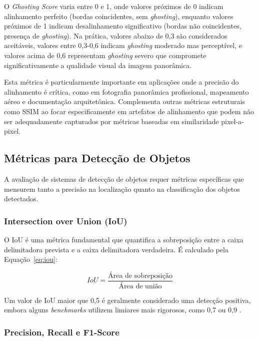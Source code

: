 O \textit{Ghosting Score} varia entre 0 e 1, onde valores próximos de 0 indicam alinhamento perfeito (bordas coincidentes, sem \textit{ghosting}), enquanto valores próximos de 1 indicam desalinhamento significativo (bordas não coincidentes, presença de \textit{ghosting}). Na prática, valores abaixo de 0,3 são considerados aceitáveis, valores entre 0,3-0,6 indicam \textit{ghosting} moderado mas perceptível, e valores acima de 0,6 representam \textit{ghosting} severo que compromete significativamente a qualidade visual da imagem panorâmica.

Esta métrica é particularmente importante em aplicações onde a precisão do alinhamento é crítica, como em fotografia panorâmica profissional, mapeamento aéreo e documentação arquitetônica. Complementa outras métricas estruturais como SSIM ao focar especificamente em artefatos de alinhamento que podem não ser adequadamente capturados por métricas baseadas em similaridade pixel-a-pixel.

\subsection{Métricas para Detecção de Objetos}

A avaliação de sistemas de detecção de objetos requer métricas específicas que mensurem tanto a precisão na localização quanto na classificação dos objetos detectados.

\subsubsection{Intersection over Union (IoU)}

O IoU é uma métrica fundamental que quantifica a sobreposição entre a caixa delimitadora prevista e a caixa delimitadora verdadeira. É calculado pela Equação~\ref{eq:iou}:

\begin{equation}
\label{eq:iou}
IoU = \frac{\text{Área de sobreposição}}{\text{Área de união}}
\end{equation}

Um valor de IoU maior que 0,5 é geralmente considerado uma detecção positiva, embora alguns \textit{benchmarks} utilizem limiares mais rigorosos, como 0,7 ou 0,9 \cite{everingham2010pascal}.

\subsubsection{Precision, Recall e F1-Score}

